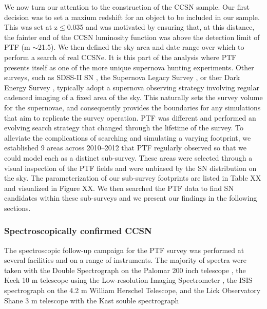 \documentclass[a4paper,fleqn,usenatbib]{mnras}
\begin{document}
We now turn our attention to the construction of the CCSN sample. Our first decision was to set a maxium redshift for an object to be included in our sample. This was set at z${\le}$0.035 and was motivated by ensuring that, at this distance, the fainter end of the CCSN luminosity function \citep{2011MNRAS.412.1441L} was above the detection limit of PTF (m ${\sim}$21.5). We then defined the sky area and date range over which to perform a search of real CCSNe. It is this part of the analysis where PTF presents itself as one of the more unique supernova hunting experiments. Other surveys, such as SDSS-II SN \citep{2008AJ....135..338F}, the Supernova Legacy Survey \citep[SNLS;][]{2006A&A...447...31A}, or ther Dark Energy Survey \citep[DES;][]{DES2005}, typically adopt a supernova observing strategy involving regular cadenced imaging of a fixed area of the sky. This naturally sets the survey volume for the supernovae, and consequently provides the boundaries for any simulations that aim to replicate the survey operation. PTF was different and performed an evolving search strategy that changed through the lifetime of the survey. To alleviate the complications of searching and simulating a varying footprint, we established 9 areas across 2010--2012 that PTF regularly observed so that we could model each as a distinct sub-survey. These areas were selected through a visual inspection of the PTF fields and were unbiased by the SN distribution on the sky. The parameterization of our sub-survey footprints are listed in Table XX and visualized in Figure XX. We then searched the PTF data to find SN candidates within these sub-surveys and we present our findings in the following sections.

\subsubsection{Spectroscopically confirmed CCSN}
\label{sec:spec_CC}

The spectroscopic follow-up campaign for the PTF survey was performed at several facilities and on a range of instruments. The majority of spectra were taken with the Double Spectrograph on the Palomar 200 inch telescope \citep{1982PASP...94..586O}, the Keck 10 m telescope using the Low-resolution Imaging Spectrometer \citep[LIRS;][]{1995PASP..107..375O}, the ISIS spectrograph on the 4.2 m William Herschel Telescope, and the Lick Observatory Shane 3 m telescope with the Kast souble spectrograph \citep{miller_lick_1993}
\end{document}
